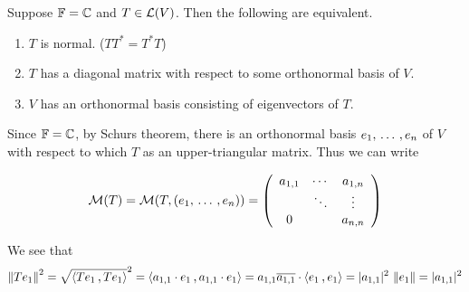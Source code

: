 \begin{thm}
  Suppose $\mathbb{F} = \mathbb{C}$ and $T \in \mathcal{L}(V)$. Then the following are equivalent.
  \begin{enumerate}[label=\textbf{(\alph*)}]
    \item $T$ is normal. ($TT^* = T^*T$)
    \item $T$ has a diagonal matrix with respect to some orthonormal basis of $V$.
    \item $V$ has an orthonormal basis consisting of eigenvectors of $T$.
  \end{enumerate}
\end{thm}
\begin{prf}
  Since $\mathbb{F}=\mathbb{C}$, by Schurs theorem, there is an orthonormal basis $e_1, {\, \ldots \,\,}, e_n$ of $V$ with respect to which $T$ as an upper-triangular matrix. Thus we can write

  \begin{equation}
    \label{eq: mmatrix T, e1...en}
    \mathcal{M}(T) = \mathcal{M} (T, (e_1, {\, \ldots \,\,}, e_n)) =
    \left(
    \begin{array}{ccc}
      a_{1,1} & \cdots & a_{1,n} \\
      & \ddots & \vdots \\
      0     &        & a_{n,n} \\
    \end{array}
    \right)
  \end{equation}

  We see that
  \[
  \norm{T e_1}^2 = \sqrt{\ip{Te_1}{Te_1}}^2
  = \ip{a_{1,1}\cdot e_1}{a_{1,1}\cdot e_1}
  = a_{1,1} \overline{a_{1,1}} \cdot  \ip{e_1}{e_1}
  = |a_{1,1}|^2 \, \norm{e_1} = |a_{1,1}|^2
  \]


\end{prf}
